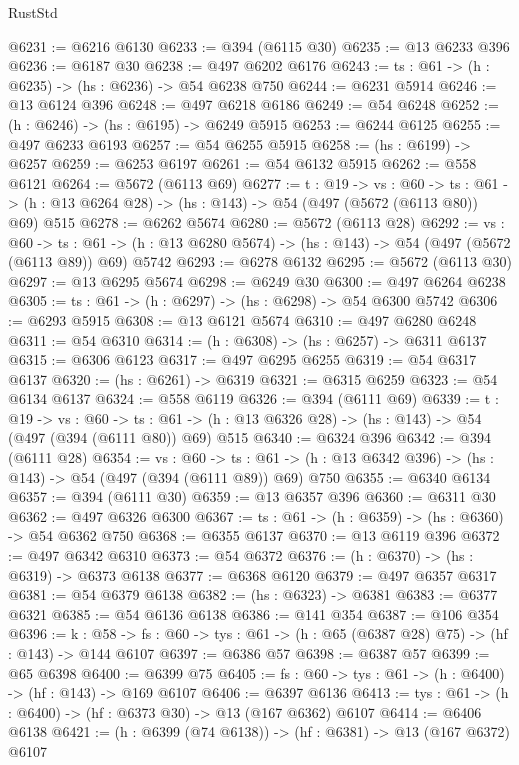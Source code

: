 \begin{lexlean}{RustStd}
\begin{coremodule}
@6231 := @6216 @6130
@6233 := @394 (@6115 @30)
@6235 := @13 @6233 @396
@6236 := @6187 @30
@6238 := @497 @6202 @6176
@6243 := {ts : @61} -> (h : @6235) -> (hs : @6236) -> @54 @6238 @750
@6244 := @6231 @5914
@6246 := @13 @6124 @396
@6248 := @497 @6218 @6186
@6249 := @54 @6248
@6252 := (h : @6246) -> (hs : @6195) -> @6249 @5915
@6253 := @6244 @6125
@6255 := @497 @6233 @6193
@6257 := @54 @6255 @5915
@6258 := (hs : @6199) -> @6257
@6259 := @6253 @6197
@6261 := @54 @6132 @5915
@6262 := @558 @6121
@6264 := @5672 (@6113 @69)
@6277 := {t : @19} ->
  {vs : @60} ->
  {ts : @61} -> (h : @13 @6264 @28) -> (hs : @143) -> @54 (@497 (@5672 (@6113 @80)) @69) @515
@6278 := @6262 @5674
@6280 := @5672 (@6113 @28)
@6292 := {vs : @60} ->
  {ts : @61} -> (h : @13 @6280 @5674) -> (hs : @143) -> @54 (@497 (@5672 (@6113 @89)) @69) @5742
@6293 := @6278 @6132
@6295 := @5672 (@6113 @30)
@6297 := @13 @6295 @5674
@6298 := @6249 @30
@6300 := @497 @6264 @6238
@6305 := {ts : @61} -> (h : @6297) -> (hs : @6298) -> @54 @6300 @5742
@6306 := @6293 @5915
@6308 := @13 @6121 @5674
@6310 := @497 @6280 @6248
@6311 := @54 @6310
@6314 := (h : @6308) -> (hs : @6257) -> @6311 @6137
@6315 := @6306 @6123
@6317 := @497 @6295 @6255
@6319 := @54 @6317 @6137
@6320 := (hs : @6261) -> @6319
@6321 := @6315 @6259
@6323 := @54 @6134 @6137
@6324 := @558 @6119
@6326 := @394 (@6111 @69)
@6339 := {t : @19} ->
  {vs : @60} ->
  {ts : @61} -> (h : @13 @6326 @28) -> (hs : @143) -> @54 (@497 (@394 (@6111 @80)) @69) @515
@6340 := @6324 @396
@6342 := @394 (@6111 @28)
@6354 := {vs : @60} ->
  {ts : @61} -> (h : @13 @6342 @396) -> (hs : @143) -> @54 (@497 (@394 (@6111 @89)) @69) @750
@6355 := @6340 @6134
@6357 := @394 (@6111 @30)
@6359 := @13 @6357 @396
@6360 := @6311 @30
@6362 := @497 @6326 @6300
@6367 := {ts : @61} -> (h : @6359) -> (hs : @6360) -> @54 @6362 @750
@6368 := @6355 @6137
@6370 := @13 @6119 @396
@6372 := @497 @6342 @6310
@6373 := @54 @6372
@6376 := (h : @6370) -> (hs : @6319) -> @6373 @6138
@6377 := @6368 @6120
@6379 := @497 @6357 @6317
@6381 := @54 @6379 @6138
@6382 := (hs : @6323) -> @6381
@6383 := @6377 @6321
@6385 := @54 @6136 @6138
@6386 := @141 @354
@6387 := @106 @354
@6396 := {k : @58} ->
  {fs : @60} -> {tys : @61} -> (h : @65 (@6387 @28) @75) -> (hf : @143) -> @144 @6107
@6397 := @6386 @57
@6398 := @6387 @57
@6399 := @65 @6398
@6400 := @6399 @75
@6405 := {fs : @60} -> {tys : @61} -> (h : @6400) -> (hf : @143) -> @169 @6107
@6406 := @6397 @6136
@6413 := {tys : @61} -> (h : @6400) -> (hf : @6373 @30) -> @13 (@167 @6362) @6107
@6414 := @6406 @6138
@6421 := (h : @6399 (@74 @6138)) -> (hf : @6381) -> @13 (@167 @6372) @6107

\end{coremodule}
\end{lexlean}

